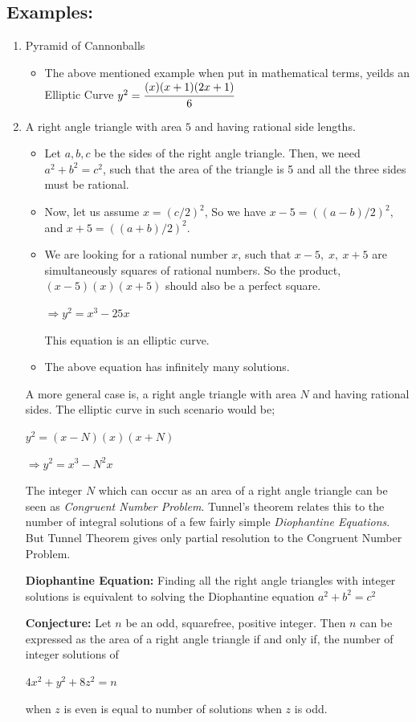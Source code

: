 \documentclass[a4paper, 12pt]{article}
\begin{document}
\subsection*{Examples:}
\begin{enumerate}[label=(\roman*)]
	\item Pyramid of Cannonballs 
	\begin{itemize}
		\item The above mentioned example when put in mathematical terms, yeilds an Elliptic Curve $y^2 = \cfrac{(x)(x+1)(2x+1)}{6}$
	\end{itemize}
	\item A right angle triangle with area $5$ and having rational side lengths.
	\begin{itemize}
		\item Let $a, b, c$ be the sides of the right angle triangle. Then, we need $a^2 + b^2 = c^2$, such that the area of the triangle is 5 and all the three sides must be rational.
		\item Now, let us assume $x = (c/2)^2$, \newline So we have $x-5 = ((a-b)/2)^2,$ \newline and $x+5 = ((a+b)/2)^2.$
		\item We are looking for a rational number $x$, such that $x-5,\; x,\: x+5$ are simultaneously squares of rational numbers. So the product, $(x-5)(x)(x+5)$ should also be a perfect square.
		\begin{center} $\Rightarrow y^2 = x^3 - 25x$ \end{center}
		This equation is an elliptic curve.
		\item The above equation has infinitely many solutions.
	\end{itemize}
	A more general case is, a right angle triangle with area $N$ and having rational sides. The elliptic curve in such scenario would be;
	\begin{center} $y^2 = (x-N)(x)(x+N)$ \par
	$\Rightarrow y^2 = x^3 - N^2x$
	\end{center}
	The integer $N$ which can occur as an area of a right angle triangle can be seen as \textit{Congruent Number Problem}. Tunnel's theorem relates this to the number of integral solutions of a few fairly simple \textit{Diophantine Equations}. But Tunnel Theorem gives only partial resolution to the Congruent Number Problem. \par
	\textbf{Diophantine Equation:} Finding all the right angle triangles with integer solutions is equivalent to solving the Diophantine equation $a^2+b^2=c^2$ \par
	\textbf{Conjecture:} Let $n$ be an odd, squarefree, positive integer. Then $n$ can be expressed as the area of a right angle triangle if and only if, the number of integer solutions of 
	\begin{center}$4x^2+y^2+8z^2=n$ \end{center} when $z$ is even is equal to number of solutions when $z$ is odd.
\end{enumerate}
\end{document}
